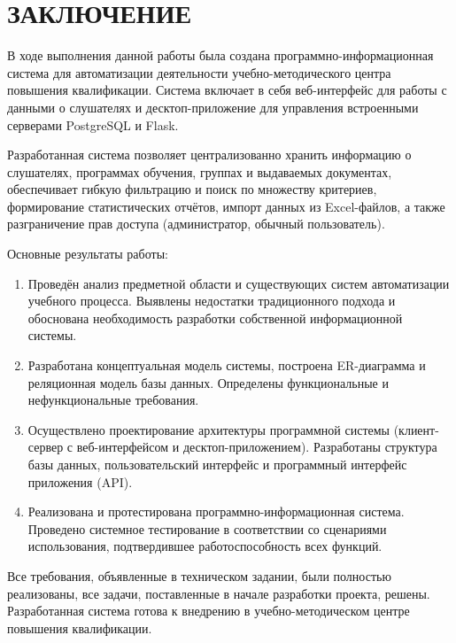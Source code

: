 \section*{ЗАКЛЮЧЕНИЕ}

В ходе выполнения данной работы была создана программно-информационная система для автоматизации деятельности учебно-методического центра повышения квалификации. Система включает в себя веб-интерфейс для работы с данными о слушателях и десктоп-приложение для управления встроенными серверами PostgreSQL и Flask.

Разработанная система позволяет централизованно хранить информацию о слушателях, программах обучения, группах и выдаваемых документах, обеспечивает гибкую фильтрацию и поиск по множеству критериев, формирование статистических отчётов, импорт данных из Excel-файлов, а также разграничение прав доступа (администратор, обычный пользователь).

Основные результаты работы:

\begin{enumerate}
	\item Проведён анализ предметной области и существующих систем автоматизации учебного процесса. Выявлены недостатки традиционного подхода и обоснована необходимость разработки собственной информационной системы.
	\item Разработана концептуальная модель системы, построена ER-диаграмма и реляционная модель базы данных. Определены функциональные и нефункциональные требования.
	\item Осуществлено проектирование архитектуры программной системы (клиент-сервер с веб-интерфейсом и десктоп-приложением). Разработаны структура базы данных, пользовательский интерфейс и программный интерфейс приложения (API).
	\item Реализована и протестирована программно-информационная система. Проведено системное тестирование в соответствии со сценариями использования, подтвердившее работоспособность всех функций.
\end{enumerate}

Все требования, объявленные в техническом задании, были полностью реализованы, все задачи, поставленные в начале разработки проекта, решены. Разработанная система готова к внедрению в учебно-методическом центре повышения квалификации.  
